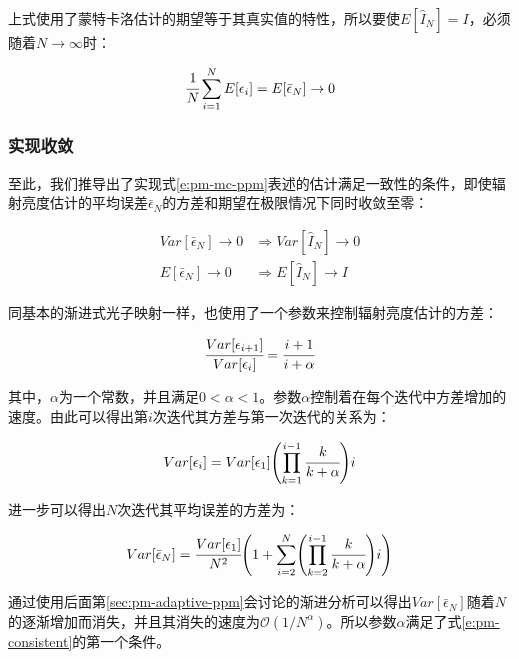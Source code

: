 \noindent 上式使用了蒙特卡洛估计的期望等于其真实值的特性，所以要使$E[\hat{I}_N]=I$，必须随着$N\to\infty$时：

\begin{equation}
	 \cfrac{1}{N}\sum^{N}_{i=1}E[\epsilon_i]=E[\bar{\epsilon}_N]\to 0
\end{equation}





\subsubsection{实现收敛}
至此，我们推导出了实现式\ref{e:pm-mc-ppm}表述的估计满足一致性的条件，即使辐射亮度估计的平均误差$\bar{\epsilon}_N$的方差和期望在极限情况下同时收敛至零：

\begin{equation}\label{e:pm-consistent}
	\begin{aligned}
		Var[\bar{\epsilon}_N]\to 0 &\Rightarrow Var[\hat{I}_N]\to 0\\
		E[\bar{\epsilon}_N]\to 0 &\Rightarrow E[\hat{I}_N]\to I
	\end{aligned}
\end{equation}

同基本的渐进式光子映射一样，\cite{a:ProgressivePhotonMappingAProbabilisticApproach}也使用了一个参数来控制辐射亮度估计的方差：

\begin{equation}
	 \cfrac{Var[\epsilon_{i+1}]}{Var[\epsilon_i]}= \cfrac{i+1}{i+\alpha}
\end{equation}

\noindent 其中，$\alpha$为一个常数，并且满足$0<\alpha<1$。参数$\alpha$控制着在每个迭代中方差增加的速度。由此可以得出第$i$次迭代其方差与第一次迭代的关系为：

\begin{equation}
	Var[\epsilon_i]=Var[\epsilon_1]\Biggl(\prod^{i-1}_{k=1} \cfrac{k}{k+\alpha}\Biggl) i
\end{equation}

\noindent 进一步可以得出$N$次迭代其平均误差的方差为：

\begin{equation}
	Var[\bar{\epsilon}_N]= \cfrac{Var[\epsilon_1]}{N^{2}}\Biggl( 1+\sum^{N}_{i=2}\Biggl(\prod^{i-1}_{k=2} \cfrac{k}{k+\alpha}\Biggl) i\Biggl)
\end{equation}

通过使用后面第\ref{sec:pm-adaptive-ppm}会讨论的渐进分析可以得出$Var[\bar{\epsilon}_N]$随着$N$的逐渐增加而消失，并且其消失的速度为$\mathcal{O}(1/N^{\alpha})$。所以参数$\alpha$满足了式\ref{e:pm-consistent}的第一个条件。

